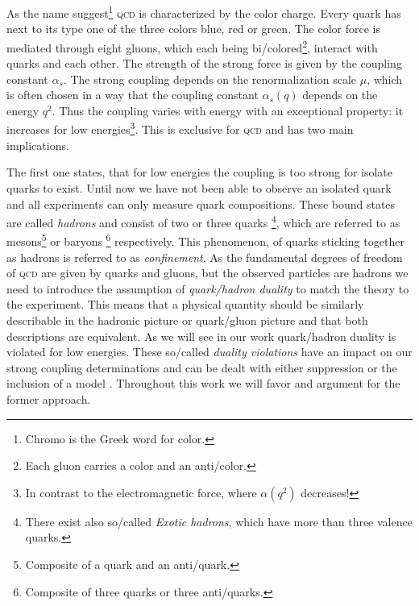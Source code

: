 \documentclass[../../index.tex]{subfiles}
\begin{document}
As the name suggest\footnote{Chromo is the Greek word for color.} \textsc{qcd}
is characterized by the color charge. Every quark has next to its type one
of the three colors blue, red or green. The color force is mediated through
eight gluons, which each being bi\-/colored\footnote{Each gluon carries a color
  and an anti\-/color.}, interact with quarks and each other. The strength of the
strong force is given by the coupling constant $\alpha_s$. The strong coupling
depends on the renormalization scale $\mu$, which is often chosen in a way that
the coupling constant $\alpha_s(q)$ depends on the energy $q^2$. Thus the
coupling varies with energy with an exceptional property: it increases for
low energies\footnote{In contrast to the electromagnetic force, where $\alpha(q^2)$
  decreases!}. This is exclusive for \textsc{qcd} and has two main implications.

The first one states, that for low energies the coupling is too strong for
isolate quarks to exist. Until now we have not been able to observe an isolated
quark and all experiments can only measure quark compositions. These bound
states are called \textit{hadrons} and consist of two or three quarks
\footnote{There exist also so\-/called \textit{Exotic hadrons}, which have more
  than three valence quarks.}, which are referred to as mesons\footnote{Composite
  of a quark and an anti\-/quark.} or baryons \footnote{Composite of three quarks
  or three anti\-/quarks.} respectively. This
phenomenon, of quarks sticking together as hadrons is referred to as \textit{confinement}. 
As the fundamental degrees of freedom of \textsc{qcd} are given by quarks and gluons, but
the observed particles are hadrons we need to introduce the assumption of
\textit{quark\-/hadron duality} to match the theory to the experiment. This means that a physical quantity should be
similarly describable in the hadronic picture or quark\-/gluon picture and that
both descriptions are equivalent. As we will see in our work quark\-/hadron
duality is violated for low energies. These so\-/called \textit{duality
  violations} have an impact on our strong coupling determinations and can be
dealt with either suppression or the inclusion of a model
\cite{Pich2006,Cata2008}.
Throughout this work we will favor and argument for the former approach.
\end{document}
